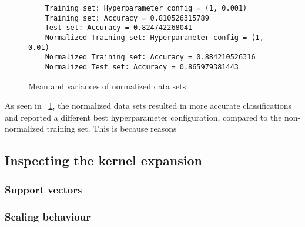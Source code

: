 \documentclass[a4paper]{article}
\begin{document}
\begin{figure}[H]
	\begin{lstlisting}
	Training set: Hyperparameter config = (1, 0.001)
	Training set: Accuracy = 0.810526315789
	Test set: Accuracy = 0.824742268041
	Normalized Training set: Hyperparameter config = (1, 0.01)
	Normalized Training set: Accuracy = 0.884210526316
	Normalized Test set: Accuracy = 0.865979381443
	\end{lstlisting}
	\caption{Mean and variances of normalized data sets}
	\label{fig:grid_search_results}
\end{figure}

As seen in ~\ref{fig:grid_search_results}, the normalized data sets resulted in more accurate classifications and reported a different best hyperparameter configuration, compared to the non-normalized training set. This is because reasons


\subsection{Inspecting the kernel expansion}

\subsubsection{Support vectors}

\subsubsection{Scaling behaviour}
\end{document}
